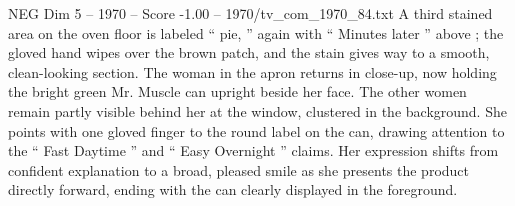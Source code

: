 \begin{textsample}{NEG Dim 5 – 1970 – Score -1.00 – 1970/tv\_com\_1970\_84.txt}
A third stained area on the oven floor is labeled “ pie, ” again with “ Minutes later ” above ; the gloved hand wipes over the brown patch, and the stain gives way to a smooth, clean-looking section.
The woman in the apron returns in close-up, now holding the bright green Mr.
Muscle can upright beside her face.
The other women remain partly visible behind her at the window, clustered in the background.
She points with one gloved finger to the round label on the can, drawing attention to the “ Fast Daytime ” and “ Easy Overnight ” claims.
Her expression shifts from confident explanation to a broad, pleased smile as she presents the product directly forward, ending with the can clearly displayed in the foreground.

\end{textsample}
